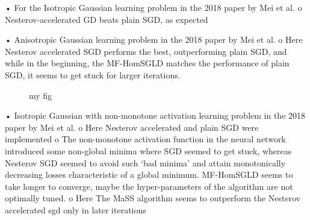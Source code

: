 \documentclass{article}
\begin{document}
•	For the Isotropic Gaussian learning problem in the 2018 paper by Mei et al.
o	Nesterov-accelerated GD beats plain SGD, as expected
 
 
•	Anisotropic Gaussian learning problem in the 2018 paper by Mei et al.
o	Here Nesterov accelerated SGD performs the best, outperforming plain SGD, and while in the beginning, the MF-HomSGLD matches the performance of plain SGD, it seems to get stuck for larger iterations. 
 


\begin{figure}\centering
{}\hfill
{}\par 
{}
\caption{my fig}
\label{fig}
\end{figure}


•	Isotropic Gaussian with non-monotone activation learning problem in the 2018 paper by Mei et al.
o	Here Nesterov accelerated and plain SGD were implemented
o	The non-monotone activation function in the neural network introduced some non-global minima where SGD seemed to get stuck, whereas Nesterov SGD seemed to avoid such ‘bad minima’ and attain monotonically decreasing losses characteristic of a global minimum. MF-HomSGLD seems to take longer to converge, maybe the hyper-parameters of the algorithm are not optimally tuned.
o	Here The MaSS algorithm seems to outperform the Nesterov accelerated sgd only in later iterations
 
\end{document}
